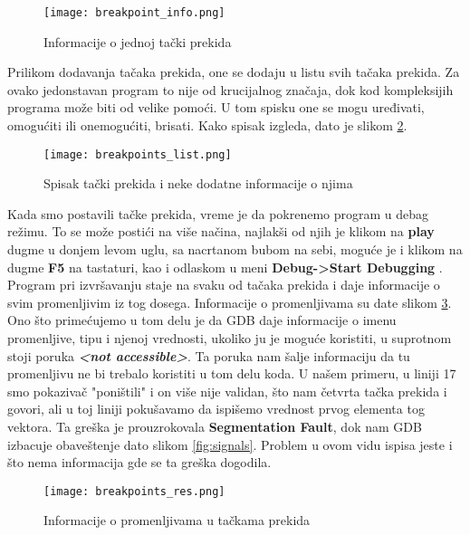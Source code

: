 \documentclass[a4paper]{article}
\begin{document}
\begin{figure}[h!]
\begin{center}
\texttt{[image: breakpoint\_info.png]}
\end{center}
\caption{Informacije o jednoj tački prekida}
\label{fig:point_info}
\end{figure}

Prilikom dodavanja tačaka prekida, one se dodaju u listu svih tačaka prekida. Za ovako jedonstavan program to 
nije od krucijalnog značaja, dok kod kompleksijih programa može biti od velike pomoći. U tom spisku one se mogu uređivati, 
omogućiti ili onemogućiti, brisati. Kako spisak izgleda, dato je slikom \ref{fig:points_list}.

\begin{figure}[h!]
\begin{center}
\texttt{[image: breakpoints\_list.png]}
\end{center}
\caption{Spisak tački prekida i neke dodatne informacije o njima}
\label{fig:points_list}
\end{figure}

Kada smo postavili tačke prekida, vreme je da pokrenemo program u debag režimu. To se može postići na više načina,
najlakši od njih je klikom na \textbf{play} dugme u donjem levom uglu, sa nacrtanom bubom na sebi, moguće je i klikom na 
dugme \textbf{F5} na tastaturi, kao i odlaskom u meni \textbf{Debug->Start Debugging} \cite{QT}.
\\

Program pri izvršavanju staje na svaku od tačaka prekida i daje informacije o svim promenljivim iz tog dosega. 
Informacije o promenljivama su date slikom \ref{fig:points_res}. 
Ono što primećujemo u tom delu je da GDB daje informacije o imenu promenljive, tipu i njenoj vrednosti, 
ukoliko ju je moguće koristiti, u suprotnom stoji poruka \textbf{\textit{<not accessible>}}. Ta poruka nam šalje
informaciju da tu promenljivu ne bi trebalo koristiti u tom delu koda. U našem primeru, u liniji 17 smo pokazivač "poništili" {} i 
on više nije validan, što nam četvrta tačka prekida i govori, ali u toj liniji pokušavamo da ispišemo vrednost prvog elementa
tog vektora. Ta greška je prouzrokovala \textbf{Segmentation Fault}, dok nam GDB izbacuje obaveštenje dato slikom \ref{fig:signals}.
Problem u ovom vidu ispisa jeste i što nema informacija gde se ta greška dogodila.

\begin{figure}[h!]
\begin{center}
\texttt{[image: breakpoints\_res.png]}
\end{center}
\caption{Informacije o promenljivama u tačkama prekida}
\label{fig:points_res}
\end{figure}
\end{document}
